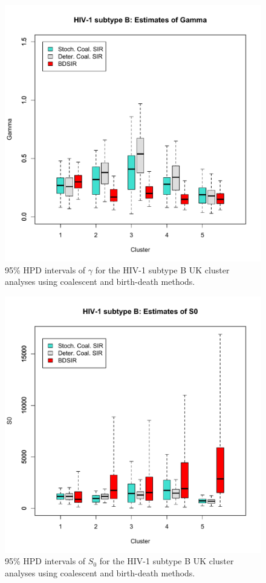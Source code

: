 \documentclass[10pt]{article}
\begin{document}
%
\begin{figure}[!ht]
\begin{center}
\includegraphics[width=\textwidth]{HIV1subtypeB_gamma.pdf}
\end{center}
\caption{
95\% HPD intervals of $\gamma$ for the HIV-1 subtype B UK cluster 
analyses using coalescent and birth-death methods.}
\label{fig:HIV_gamma}
\end{figure}
%
\begin{figure}[!ht]
\begin{center}
\includegraphics[width=\textwidth]{HIV1subtypeB_S0.pdf}
\end{center}
\caption{95\% HPD intervals of $S_0$ for the HIV-1 subtype B UK cluster 
analyses using coalescent and birth-death methods.}
\label{fig:HIV_S0}
\end{figure}
\end{document}
